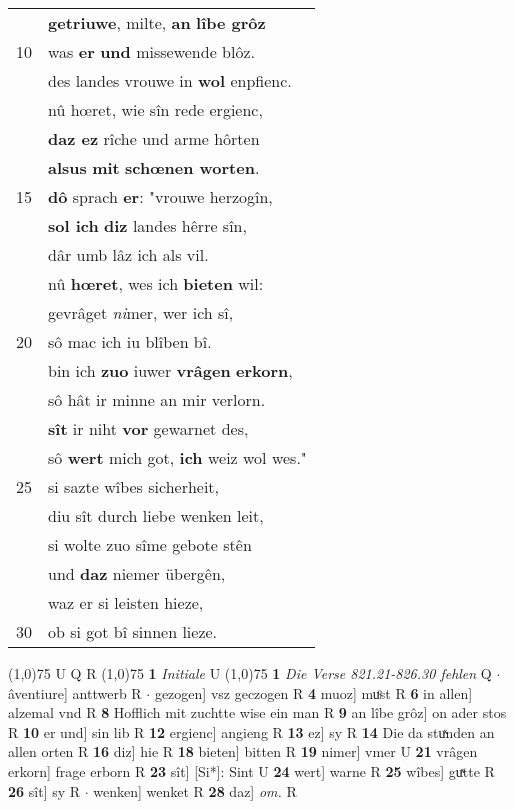 \documentclass[8pt,a4paper,notitlepage]{article}
\begin{document}
\begin{table}[ht]
\begin{minipage}[t]{0.5\linewidth}
\begin{tabular}{rl}
 & \textbf{getriuwe}, milte, \textbf{an} \textbf{lîbe grôz}\\ 
10 & was \textbf{er} \textbf{und} missewende blôz.\\ 
 & des landes vrouwe in \textbf{wol} enpfienc.\\ 
 & nû hœret, wie sîn rede ergienc,\\ 
 & \textbf{daz ez} rîche und arme hôrten\\ 
 & \textbf{alsus} \textbf{mit} \textbf{schœnen worten}.\\ 
15 & \textbf{dô} sprach \textbf{er}: "vrouwe herzogîn,\\ 
 & \textbf{sol ich} \textbf{diz} landes hêrre sîn,\\ 
 & dâr umb lâz ich als vil.\\ 
 & nû \textbf{hœret}, wes ich \textbf{bieten} wil:\\ 
 & gevrâget \textit{ni}mer, wer ich sî,\\ 
20 & sô mac ich iu blîben bî.\\ 
 & bin ich \textbf{zuo} iuwer \textbf{vrâgen} \textbf{erkorn},\\ 
 & sô hât ir minne an mir verlorn.\\ 
 & \textbf{sît} ir niht \textbf{vor} gewarnet des,\\ 
 & sô \textbf{wert} mich got, \textbf{ich} weiz wol wes."\\ 
25 & si sazte wîbes sicherheit,\\ 
 & diu sît durch liebe wenken leit,\\ 
 & si wolte zuo sîme gebote stên\\ 
 & und \textbf{daz} niemer übergên,\\ 
 & waz er si leisten hieze,\\ 
30 & ob si got bî sinnen lieze.\\ 
\end{tabular}
\scriptsize
\line(1,0){75} \newline
U Q R \newline
\line(1,0){75} \newline
\textbf{1} \textit{Initiale} U  \newline
\line(1,0){75} \newline
\textbf{1} \textit{Die Verse 821.21-826.30 fehlen} Q   $\cdot$ âventiure] anttwerb R  $\cdot$ gezogen] vsz geczogen R \textbf{4} muoz] muͦst R \textbf{6} in allen] alzemal vnd R \textbf{8} Hofflich mit zuchtte wise ein man R \textbf{9} an lîbe grôz] on ader stos R \textbf{10} er und] sin lib R \textbf{12} ergienc] angieng R \textbf{13} ez] sy R \textbf{14} Die da stuͯnden an allen orten R \textbf{16} diz] hie R \textbf{18} bieten] bitten R \textbf{19} nimer] vmer U \textbf{21} vrâgen erkorn] frage erborn R \textbf{23} sît] [Si*]: Sint U \textbf{24} wert] warne R \textbf{25} wîbes] guͯtte R \textbf{26} sît] sy R  $\cdot$ wenken] wenket R \textbf{28} daz] \textit{om.} R \newline
\end{minipage}
\end{table}
\end{document}
